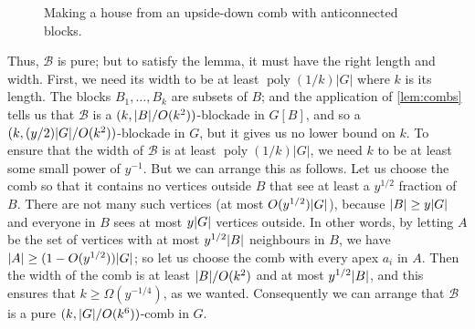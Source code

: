 \documentclass[11pt,reqno,a4paper]{amsart}
\newcommand{\mac}{\mathcal}
\newcommand{\poly}{\operatorname{poly}}
\DeclarePairedDelimiter\abs{\lvert}{\rvert}%
\begin{document}
\begin{figure}[ht]
		
		\caption{Making a house from an upside-down comb with anticonnected blocks.}
		\label{fig:comb}
	\end{figure}
	
	Thus, $\mac B$ is pure; but to satisfy the lemma, it must have the right length and width. First, 
	we need its width to be at least $\poly(1/k)|G|$ where $k$ is its length. 
	The blocks $B_1,\ldots,B_k$ are subsets of $B$; and the application of \cref{lem:combs} tells us that $\mac B$ is a 
	$(k,\abs B/O(k^2))$-blockade in $G[B]$,
	and so a $(k,(y/2)\abs G/O(k^2))$-blockade in $G$, but it gives us no lower bound on $k$.
	To ensure that the width of $\mac B$ is at least $\poly(1/k)|G|$, we need $k$ to be at least some small power of 
	$y^{-1}$. But we can arrange this as follows. 
	Let us choose the comb so that it contains no vertices outside $B$ that see at least a $y^{1/2}$ fraction of $B$. 
	There are not many such vertices (at most $O(y^{1/2})\abs G$), because $\abs B\ge y\abs G$ and everyone in $B$ sees at most $y\abs G$ vertices outside.
	In other words, by letting $A$ be the set of vertices with at most $y^{1/2}\abs B$ neighbours in $B$, we have $\abs A\ge (1-O(y^{1/2}))\abs G$;
	so let us choose the comb with every apex $a_i$ in $A$. Then the width of the comb is at least $\abs B/O(k^2)$ and at most
	$y^{1/2}\abs B$, and this ensures that $k\ge \Omega(y^{-1/4})$,  as we wanted. 
	Consequently we can arrange that $\mac B$ is a pure $(k,\abs G/O(k^{6}))$-comb in $G$.
	
\end{document}
